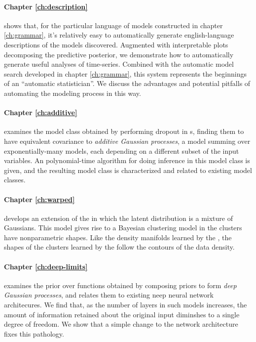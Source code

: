 \paragraph{Chapter \ref{ch:description}} shows that, for the particular language of models constructed in chapter \ref{ch:grammar}, it's relatively easy to automatically generate english-language descriptions of the models discovered.
Augmented with interpretable plots decomposing the predictive posterior, we demonstrate how to automatically generate useful analyses of time-series.
Combined with the automatic model search developed in chapter \ref{ch:grammar}, this system represents the beginnings of an ``automatic statistician''.
We discuss the advantages and potential pitfalls of automating the modeling process in this way.

\paragraph{Chapter \ref{ch:additive}} examines the model class obtained by performing dropout in \gp{}s, finding them to have equivalent covariance to \emph{additive Gaussian processes}, a model summing over exponentially-many \gp{} models, each depending on a different subset of the input variables.  An polynomial-time algorithm for doing inference in this model class is given, and the resulting model class is characterized and related to existing model classes.

\paragraph{Chapter \ref{ch:warped}} develops an extension of the \gplvm{} in which the latent distribution is a mixture of Gaussians.  This model gives rise to a Bayesian clustering model in the clusters have nonparametric shapes.  Like the density manifolds learned by the \gplvm{}, the shapes of the clusters learned by the \iwmm{} follow the contours of the data density.

\paragraph{Chapter \ref{ch:deep-limits}} examines the prior over functions obtained by composing \gp{} priors to form \emph{deep Gaussian processes}, and relates them to existing neep neural network architecures.
We find that, as the number of layers in such models increases, the amount of information retained about the original input diminshes to a single degree of freedom.
We show that a simple change to the network architecture fixes this pathology.


